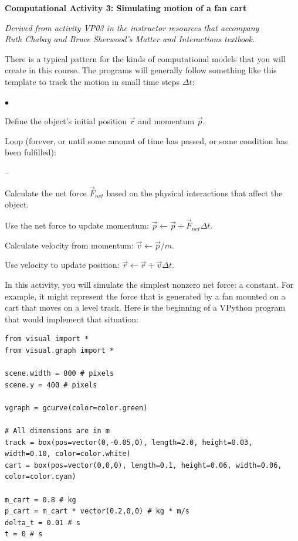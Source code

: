\documentclass[11pt]{article}
\newcommand{\squishlist}{
   \begin{list}{$\bullet$}
    { \setlength{\itemsep}{0pt}      \setlength{\parsep}{3pt}
      \setlength{\topsep}{3pt}       \setlength{\partopsep}{0pt}
      \setlength{\leftmargin}{1.5em} \setlength{\labelwidth}{1em}
      \setlength{\labelsep}{0.5em} } }
\newcommand{\squishlistB}{
   \begin{list}{--}
    { \setlength{\itemsep}{0pt}      \setlength{\parsep}{3pt}
      \setlength{\topsep}{3pt}       \setlength{\partopsep}{0pt}
      \setlength{\leftmargin}{1.5em} \setlength{\labelwidth}{1em}
      \setlength{\labelsep}{0.5em} } }
\newcommand{\squishend}{
    \end{list}  }
\begin{document}
\begin{center}
\medskip
{\bf{Computational Activity 3: Simulating motion of a fan cart}} 
\medskip

{\em{Derived from activity VP03 in the instructor resources that
 accompany \\ Ruth Chabay and Bruce Sherwood's {\em Matter and Interactions} 
 textbook.}}
\medskip
\end{center}

There is a typical pattern for the kinds of computational models
that you will create in this course.  The programs will generally 
follow something like this template to track the motion in small 
time steps $\Delta t$:

\squishlist
\item Define the object's initial position $\vec{r}$ and momentum $\vec{p}$.
\item Loop (forever, or until some amount of time has passed, or some
  condition has been fulfilled):
\squishlistB
  \item Calculate the net force $\vec{F}_{net}$ based on the physical 
      interactions that affect the object.
  \item Use the net force to update momentum: $\vec{p} \leftarrow \vec{p} + \vec{F}_{net} \Delta t$.
  \item Calculate velocity from momentum: $\vec{v} \leftarrow \vec{p}/m$.
  \item Use velocity to update position: $\vec{r} \leftarrow \vec{r} + \vec{v} \Delta t$.
\squishend
\squishend

\bigskip

In this activity, you will simulate the simplest nonzero net force: a constant.
For example, it might represent the force that is 
generated by a fan mounted on a cart that moves on a level track.
Here is the beginning of a VPython program that would implement that situation:

{\footnotesize{
\begin{verbatim}
from visual import *
from visual.graph import *

scene.width = 800 # pixels
scene.y = 400 # pixels

vgraph = gcurve(color=color.green)

# All dimensions are in m 
track = box(pos=vector(0,-0.05,0), length=2.0, height=0.03, width=0.10, color=color.white)
cart = box(pos=vector(0,0,0), length=0.1, height=0.06, width=0.06, color=color.cyan)

m_cart = 0.8 # kg
p_cart = m_cart * vector(0.2,0,0) # kg * m/s
delta_t = 0.01 # s
t = 0 # s
\end{verbatim}
}}
\end{document}
